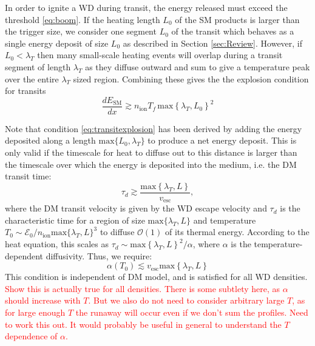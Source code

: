 \documentclass[twocolumn,showpacs,preprintnumbers,amsmath,amssymb,prd]{revtex4}
\newcommand{\OO}{\mathcal{O}}
\begin{document}
In order to ignite a WD during transit, the energy released must exceed the threshold \eqref{eq:boom}.  If the heating length $L_0$ of the SM products is larger than the trigger size, we consider one segment $L_0$ of the transit which behaves as a single energy deposit of size $L_0$ as described in Section \ref{sec:Review}. However, if $L_0 < \lambda_T$ then many small-scale heating events will overlap during a transit segment of length $\lambda_T$ as they diffuse outward and sum to give a temperature peak over the entire $\lambda_T$ sized region. Combining these gives the the explosion condition for transits
\begin{equation}
\label{eq:transitexplosion}
  \frac{d E_\text{SM}}{d x} \gtrsim n_\text{ion} T_f\, \text{max}\left\{\lambda_T, L_0 \right\}^2
\end{equation}

Note that condition \eqref{eq:transitexplosion} has been derived by adding the energy deposited along a length $\text{max} \{L_0, \lambda_T\}$ to produce a net energy deposit.  This is only valid if the timescale for heat to diffuse out to this distance is larger than the timescale over which the energy is deposited into the medium, i.e. the DM transit time:
\begin{equation}
\tau_d \gtrsim \frac{\text{max}\left\{ \lambda_T, L \right\}}{v_\text{esc}},
\end{equation}
where the DM transit velocity is given by the WD escape velocity and $\tau_d$ is the characteristic time for a region of size $\text{max}\{\lambda_T, L\}$ and temperature $T_0 \sim \mathcal{E}_0 / n_\text{ion} \text{max}\{\lambda_T, L\}^3$ to diffuse $\OO(1)$ of its thermal energy.  According to the heat equation, this scales as $\tau_d \sim \text{max}\left\{ \lambda_T, L \right\}^2/\alpha$, where $\alpha$ is the temperature-dependent diffusivity. Thus, we require:
\begin{equation}
\alpha (T_0) \lesssim v_\text{esc} \text{max}\left\{ \lambda_T, L \right\} 
\label{eq:SlowDiffusion}
\end{equation}
This condition is independent of DM model, and is satisfied for all WD densities. 
\textcolor{red}{Show this is actually true for all densities.} \textcolor{red}{There is some subtlety here, as $\alpha$ should increase with $T$. But we also do not need to consider arbitrary large $T$, as for large enough $T$ the runaway will occur even if we don't sum the profiles. Need to work this out. It would probably be useful in general to understand the $T$ dependence of $\alpha$.}
\end{document}
